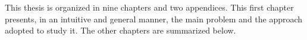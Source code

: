     
    
    
    
    

This thesis is organized in nine chapters and two appendices.
%
This first chapter presents, in an intuitive and general manner, the main problem and the approach adopted to study it.
%
The other chapters are summarized below.

